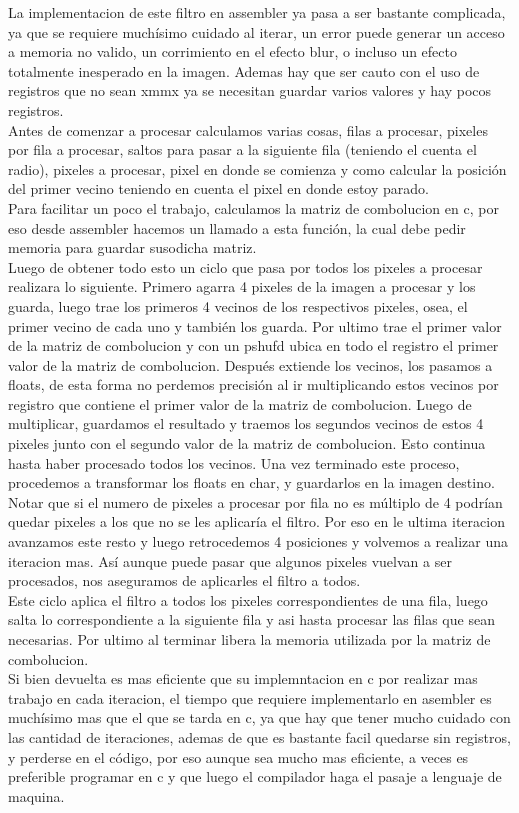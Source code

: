 La implementacion de este filtro en assembler ya pasa a ser bastante complicada, ya que se requiere muchísimo cuidado al iterar, un error puede generar un acceso a memoria no valido, un corrimiento en el efecto blur, o incluso un efecto totalmente inesperado en la imagen. Ademas hay que ser cauto con el uso de registros que no sean xmmx ya se necesitan guardar varios valores y hay pocos registros. \\
Antes de comenzar a procesar calculamos varias cosas, filas a procesar, pixeles por fila a procesar, saltos para pasar a la siguiente fila (teniendo el cuenta el radio), pixeles a procesar, pixel en donde se comienza y como calcular la posición del primer vecino teniendo en cuenta el pixel en donde estoy parado. \\
Para facilitar un poco el trabajo, calculamos la matriz de combolucion en c, por eso desde assembler hacemos un llamado a esta función, la cual debe pedir memoria para guardar susodicha matriz. \\
Luego de obtener todo esto un ciclo que pasa por todos los pixeles a procesar realizara lo siguiente. Primero agarra 4 pixeles de la imagen a procesar y los guarda, luego trae los primeros 4 vecinos de los respectivos pixeles, osea, el primer vecino de cada uno y también los guarda. Por ultimo trae el primer valor de la matriz de combolucion y con un pshufd ubica en todo el registro el primer valor de la matriz de combolucion. Después extiende los vecinos, los pasamos a floats, de esta forma no perdemos precisión al ir multiplicando estos vecinos por registro que contiene el primer valor de la matriz de combolucion. Luego de multiplicar, guardamos el resultado y traemos los segundos vecinos de estos 4 pixeles junto con el segundo valor de la matriz de combolucion. Esto continua hasta haber procesado todos los vecinos. Una vez terminado este proceso, procedemos a transformar los floats en char, y guardarlos en la imagen destino. Notar que si el numero de pixeles a procesar por fila no es múltiplo de 4 podrían quedar pixeles a los que no se les aplicaría el filtro. Por eso en le ultima iteracion avanzamos este resto y luego retrocedemos 4 posiciones y volvemos a realizar una iteracion mas. Así aunque puede pasar que algunos pixeles vuelvan a ser procesados, nos aseguramos de aplicarles el filtro a todos. \\
Este ciclo aplica el filtro a todos los pixeles correspondientes de una fila, luego salta lo correspondiente a la siguiente fila y asi hasta procesar las filas que sean necesarias. Por ultimo al terminar libera la memoria utilizada por la matriz de combolucion. \\
Si bien devuelta es mas eficiente que su implemntacion en c por realizar mas trabajo en cada iteracion, el tiempo que requiere implementarlo en asembler es muchísimo mas que el que se tarda en c, ya que hay que tener mucho cuidado con las cantidad de iteraciones, ademas de que es bastante facil quedarse sin registros, y perderse en el código, por eso aunque sea mucho mas eficiente, a veces es preferible programar en c y que luego el compilador haga el pasaje a lenguaje de maquina. \\